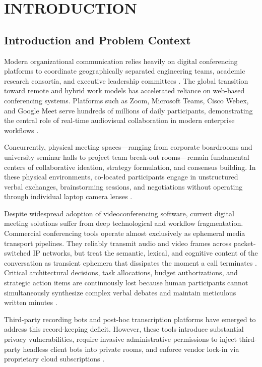 \documentclass[12pt,oneside,letterpaper]{report}
\numberwithin{equation}{chapter} %
\begin{document}
\chapter{INTRODUCTION}

\section{Introduction and Problem Context}
Modern organizational communication relies heavily on digital conferencing platforms to coordinate geographically separated engineering teams, academic research consortia, and executive leadership committees \cite{kraut2021visual}. The global transition toward remote and hybrid work models has accelerated reliance on web-based conferencing systems. Platforms such as Zoom, Microsoft Teams, Cisco Webex, and Google Meet serve hundreds of millions of daily participants, demonstrating the central role of real-time audiovisual collaboration in modern enterprise workflows \cite{subbiah2022performance}.

Concurrently, physical meeting spaces---ranging from corporate boardrooms and university seminar halls to project team break-out rooms---remain fundamental centers of collaborative ideation, strategy formulation, and consensus building. In these physical environments, co-located participants engage in unstructured verbal exchanges, brainstorming sessions, and negotiations without operating through individual laptop camera lenses \cite{morgan2022acoustic}.

Despite widespread adoption of videoconferencing software, current digital meeting solutions suffer from deep technological and workflow fragmentation. Commercial conferencing tools operate almost exclusively as ephemeral media transport pipelines. They reliably transmit audio and video frames across packet-switched IP networks, but treat the semantic, lexical, and cognitive content of the conversation as transient ephemera that dissipates the moment a call terminates \cite{karakos2021statistical}. Critical architectural decisions, task allocations, budget authorizations, and strategic action items are continuously lost because human participants cannot simultaneously synthesize complex verbal debates and maintain meticulous written minutes \cite{renals2008recognition}.

Third-party recording bots and post-hoc transcription platforms have emerged to address this record-keeping deficit. However, these tools introduce substantial privacy vulnerabilities, require invasive administrative permissions to inject third-party headless client bots into private rooms, and enforce vendor lock-in via proprietary cloud subscriptions \cite{cranor2022privacy}.
\end{document}
